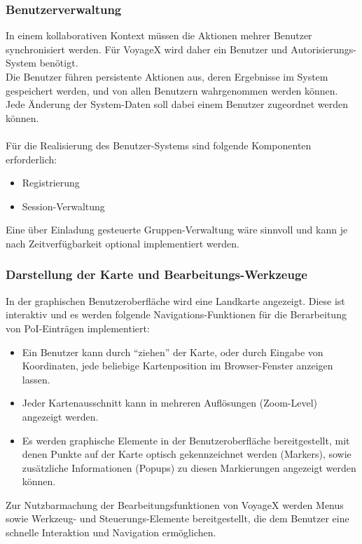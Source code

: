 \subsubsection{Benutzerverwaltung}
In einem kollaborativen Kontext müssen die Aktionen mehrer Benutzer synchronisiert werden. Für VoyageX wird daher ein Benutzer und Autorisierungs-System benötigt.\\
Die Benutzer führen persistente Aktionen aus, deren Ergebnisse im System gespeichert werden, und von allen Benutzern wahrgenommen werden können. Jede Änderung der System-Daten soll dabei einem Benutzer zugeordnet werden können.\\ \\
Für die Realisierung des Benutzer-Systems sind folgende Komponenten erforderlich:
\begin{itemize}
  \item Registrierung
  \item Session-Verwaltung
\end{itemize}
Eine über Einladung gesteuerte Gruppen-Verwaltung wäre sinnvoll und kann je nach Zeitverfügbarkeit optional
implementiert werden.

\subsubsection{Darstellung der Karte und Bearbeitungs-Werkzeuge}
In der graphischen Benutzeroberfläche wird eine Landkarte angezeigt. Diese ist interaktiv und es werden
folgende Navigations-Funktionen für die Berarbeitung von PoI-Einträgen implementiert:
\begin{itemize}
  \item Ein Benutzer kann durch "`ziehen"' der Karte, oder durch Eingabe von Koordinaten, jede beliebige Kartenposition im Browser-Fenster anzeigen lassen.
  \item Jeder Kartenausschnitt kann in mehreren Auflösungen (Zoom-Level) angezeigt werden.
  \item Es werden graphische Elemente in der Benutzeroberfläche bereitgestellt, mit denen Punkte auf der Karte optisch gekennzeichnet werden (Markers), sowie zusätzliche Informationen (Popups) zu diesen Markierungen angezeigt werden können.
\end{itemize}
Zur Nutzbarmachung der Bearbeitungsfunktionen von VoyageX werden Menus sowie Werkzeug- und Steuerungs-Elemente bereitgestellt, die dem Benutzer eine schnelle Interaktion und Navigation ermöglichen.

